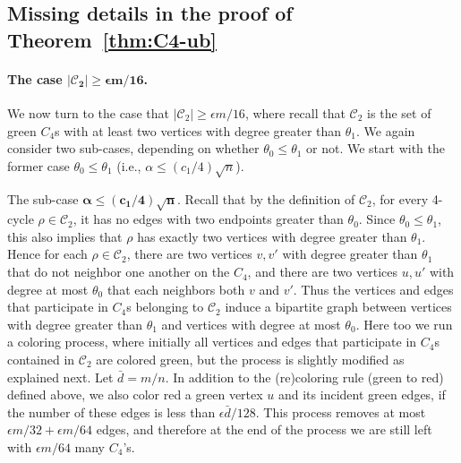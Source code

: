 \documentclass{article}
\newcommand{\eps}{\epsilon}
\newcommand{\calC}{{\mathcal{C}}}
\newcommand{\commentt}[1]{ {}}
\begin{document}
\subsection{Missing details in the proof of Theorem~\ref{thm:C4-ub}}\label{append:case-C2}
\paragraph{The case $\mathbf{|\calC_2| \geq \eps m/16}$.}
We now turn to the case that $|\calC_2| \geq \eps m/16$, 
where recall that $\calC_2$ is the set of green $C_4$s with at least two vertices with degree greater than $\theta_1$. 
We again consider two sub-cases, depending on whether $\theta_0\leq \theta_1$ or not. 
We start with the former case $\theta_0\leq \theta_1$ (i.e., $\alpha \leq (c_1/4)\sqrt n$). 

\smallskip\noindent
\textsf{The sub-case $\mathbf{\alpha\leq (c_1/4)\sqrt n}$.}
Recall that by the definition of $\calC_2$, for every 4-cycle  $\rho\in \calC_2$, it has no edges with two endpoints greater than $\theta_0$. Since $\theta_0\leq \theta_1$, this also implies that $\rho$ has exactly two vertices with degree greater than $\theta_1$. 
Hence for each $\rho\in \calC_2$, there are two vertices $v,v'$ with degree greater than $\theta_1$ that do not neighbor one another on the $C_4$, and there are two vertices $u,u'$ with degree at most $\theta_0$ that each neighbors both $v$ and $v'$. Thus the vertices and edges that participate in $C_4$s belonging to $\calC_2$ induce a bipartite graph between vertices with degree greater than $\theta_1$ and vertices with degree at most $\theta_0$. Here too we run a coloring process, where initially all vertices and edges that participate in $C_4$s contained in $\calC_2$ are colored green, but the process is slightly modified as explained next. Let $\bar{d} = m/n$.  In addition to the (re)coloring rule (green to red) defined above,
we also color red a green vertex $u$ and its incident green edges, if the number of these edges is less than 
$\eps\bar{d}/128$. This process removes at most $\eps m/32+\eps m/64$ edges, and therefore at the end of the process we are still left with $\eps m/64$ many $C_4$'s.
\end{document}
